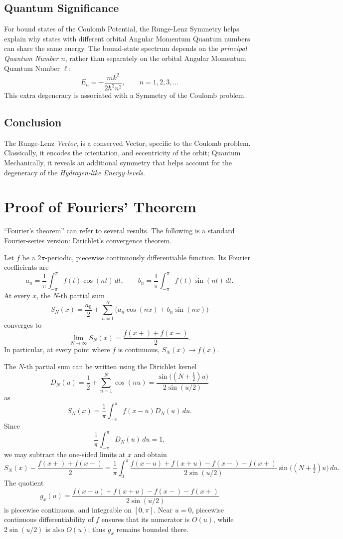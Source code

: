 \documentclass[a4paper, 10pt, onepage]{elegantbook}
\begin{document}
\subsection{Quantum Significance}

For bound states of the Coulomb Potential, the Runge-Lenz Symmetry helps explain why states with different orbital Angular Momentum
Quantum numbers can share the same energy. The bound-state spectrum depends on the \emph{principal Quantum Number \(n\)}, rather than separately on the orbital Angular Momentum Quantum Number \(\ell\):
\[
E_n=-\frac{m k^2}{2\hbar^2 n^2},
\qquad n=1,2,3,\ldots
\]
This extra degeneracy is associated with a Symmetry of the Coulomb problem.

\subsection{Conclusion}

The Runge-Lenz \emph{Vector}, is a conserved Vector, specific to the Coulomb problem. Classically, it encodes the orientation, and eccentricity of the orbit; Quantum Mechanically, it reveals an additional symmetry that helps account for the degeneracy of the \emph{Hydrogen-like Energy levels}.


\section{Proof of Fouriers' Theorem}

“Fourier’s theorem” can refer to several results. The following is a standard Fourier-series version: Dirichlet’s convergence theorem.  

Let \(f\) be a \(2\pi\)-periodic, piecewise continuously differentiable
function. Its Fourier coefficients are
\[
a_n=\frac{1}{\pi}\int_{-\pi}^{\pi} f(t)\cos(nt)\,dt,
\qquad
b_n=\frac{1}{\pi}\int_{-\pi}^{\pi} f(t)\sin(nt)\,dt.
\]
At every \(x\), the \(N\)-th partial sum
\[
S_N(x)=\frac{a_0}{2}
+\sum_{n=1}^{N}\bigl(a_n\cos(nx)+b_n\sin(nx)\bigr)
\]
converges to
\[
\lim_{N\to\infty}S_N(x)
=\frac{f(x+)+f(x-)}{2}.
\]
In particular, at every point where \(f\) is continuous,
\(S_N(x)\to f(x)\).


The \(N\)-th partial sum can be written using the Dirichlet kernel
\[
D_N(u)=\frac{1}{2}+\sum_{n=1}^{N}\cos(nu)
=\frac{\sin\bigl((N+\tfrac12)u\bigr)}{2\sin(u/2)}
\]
as
\[
S_N(x)=\frac{1}{\pi}\int_{-\pi}^{\pi}f(x-u)D_N(u)\,du.
\]
Since
\[
\frac{1}{\pi}\int_{-\pi}^{\pi}D_N(u)\,du=1,
\]
we may subtract the one-sided limits at \(x\) and obtain
\[
S_N(x)-\frac{f(x+)+f(x-)}{2}
=
\frac{1}{\pi}\int_0^\pi
\frac{f(x-u)+f(x+u)-f(x-)-f(x+)}
     {2\sin(u/2)}
\sin\bigl((N+\tfrac12)u\bigr)\,du.
\]
The quotient
\[
g_x(u)=
\frac{f(x-u)+f(x+u)-f(x-)-f(x+)}
     {2\sin(u/2)}
\]
is piecewise continuous, and integrable on \([0,\pi]\). Near \(u=0\), piecewise continuous differentiability of \(f\) ensures that its numerator is \(O(u)\), while \(2\sin(u/2)\) is also \(O(u)\); thus \(g_x\) remains bounded there.
\end{document}

